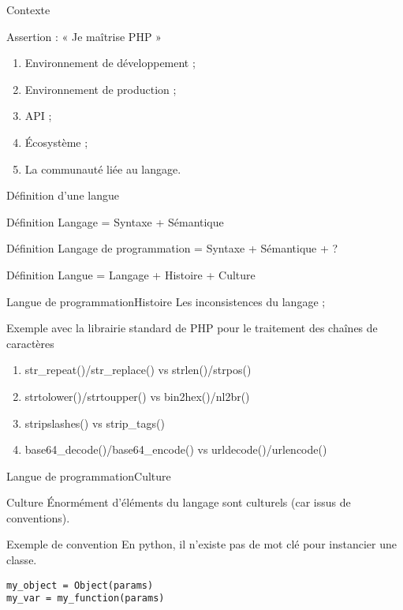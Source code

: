 \documentclass[12pt]{beamer}
\begin{document}
\begin{frame}{Contexte}
\begin{block}{Assertion : « Je maîtrise PHP »}
\begin{enumerate}[<+->]
\pause
\item Environnement de développement ;
\item Environnement de production ;
\item API ;
\item Écosystème ;
\item La communauté liée au langage.
\end{enumerate}
\end{block}
\end{frame}

\begin{frame}{Définition d'une langue}
\begin{block}{Définition}
Langage = Syntaxe + Sémantique
\end{block}
\begin{block}{Définition}
Langage de programmation = Syntaxe + Sémantique + ?
\end{block}
\pause
\begin{block}{Définition}
Langue = Langage + Histoire + Culture
\end{block}
\end{frame}

\begin{frame}{Langue de programmation}{Histoire}
Les inconsistences du langage ;
\pause
\begin{alertblock}{Exemple avec la librairie standard de PHP pour le traitement des 
chaînes de caractères}
\begin{enumerate}
\item str\_repeat()/str\_replace() vs strlen()/strpos()
\item strtolower()/strtoupper() vs bin2hex()/nl2br()
\item stripslashes() vs strip\_tags()
\item base64\_decode()/base64\_encode() vs urldecode()/urlencode()
\end{enumerate}
\end{alertblock}
\end{frame}

\begin{frame}[fragile]{Langue de programmation}{Culture}
\begin{block}{Culture}
Énormément d'éléments du langage sont culturels (car issus de conventions).
\end{block}
\pause
\begin{exampleblock}{Exemple de convention}
En python, il n'existe pas de mot clé pour instancier une classe.
    \begin{lstlisting}
my_object = Object(params)
my_var = my_function(params)
    \end{lstlisting}
\end{exampleblock}
\end{frame}
\end{document}
